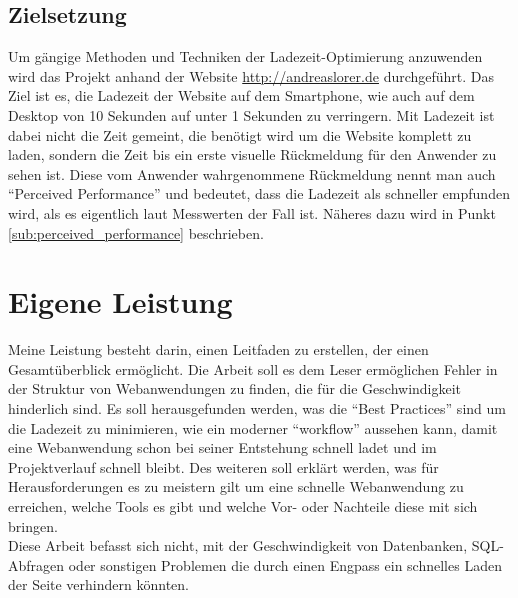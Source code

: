 \subsection{Zielsetzung} %
\label{sub:zielsetzung}
	Um gängige Methoden und Techniken der Ladezeit-Optimierung anzuwenden wird das Projekt anhand der Website \url{http://andreaslorer.de} durchgeführt. Das Ziel ist es, die Ladezeit der Website auf dem Smartphone, wie auch auf dem Desktop von 10 Sekunden auf unter 1 Sekunden zu verringern. Mit Ladezeit ist dabei nicht die Zeit gemeint, die benötigt wird um die Website komplett zu laden, sondern die Zeit bis ein erste visuelle Rückmeldung für den Anwender zu sehen ist. Diese vom Anwender wahrgenommene Rückmeldung nennt man auch "`Perceived Performance"' und bedeutet, dass die Ladezeit als schneller empfunden wird, als es eigentlich laut Messwerten der Fall ist. Näheres dazu wird in Punkt \ref{sub:perceived_performance} beschrieben.\\


\section{Eigene Leistung} %
\label{sub:eigene_leistung}
	Meine Leistung besteht darin, einen Leitfaden zu erstellen, der einen Gesamtüberblick ermöglicht. Die Arbeit soll es dem Leser ermöglichen Fehler in der Struktur von Webanwendungen zu finden, die für die Geschwindigkeit hinderlich sind.
	Es soll herausgefunden werden, was die "`Best Practices"' sind um die Ladezeit zu minimieren, wie ein moderner "`workflow"' aussehen kann, damit eine Webanwendung schon bei seiner Entstehung schnell ladet und im Projektverlauf schnell bleibt. Des weiteren soll erklärt werden, was für Herausforderungen es zu meistern gilt um eine schnelle Webanwendung zu erreichen, welche Tools es gibt und welche Vor- oder Nachteile diese mit sich bringen.\\
	Diese Arbeit befasst sich nicht, mit der Geschwindigkeit von Datenbanken, SQL-Abfragen oder sonstigen Problemen die durch einen Engpass ein schnelles Laden der Seite verhindern könnten.



